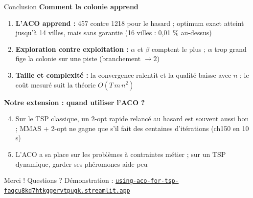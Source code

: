 \documentclass[aspectratio=169,11pt]{beamer}
\begin{document}
\begin{frame}{Conclusion}
  \footnotesize
  \textbf{Comment la colonie apprend}
  \begin{enumerate}
    \item \textbf{L'ACO apprend :} 457 contre 1218 pour le hasard ; optimum exact atteint jusqu'à
          14 villes, mais sans garantie (16 villes : 0,01 \% au-dessus)
    \item \textbf{Exploration contre exploitation :} $\alpha$ et $\beta$ comptent le plus ;
          $\alpha$ trop grand fige la colonie sur une piste (branchement $\to 2$)
    \item \textbf{Taille et complexité :} la convergence ralentit et la qualité baisse avec $n$ ;
          le coût mesuré suit la théorie $O(T\,m\,n^2)$
  \end{enumerate}
  \textbf{Notre extension : quand utiliser l'ACO ?}
  \begin{enumerate}\setcounter{enumi}{3}
    \item Sur le TSP classique, un 2-opt rapide relancé au hasard est souvent aussi bon ;
          \alert{MMAS + 2-opt} ne gagne que s'il fait des centaines d'itérations (ch150 en 10 s)
    \item L'ACO a sa place sur les problèmes à contraintes métier ; sur un TSP dynamique, garder
          ses phéromones aide peu
  \end{enumerate}
  \centering
  \alert{Merci ! Questions ?} \quad
  \scriptsize Démonstration :
  \href{https://using-aco-for-tsp-faqcu8kd7htkggervtpugk.streamlit.app}{\nolinkurl{using-aco-for-tsp-faqcu8kd7htkggervtpugk.streamlit.app}}
\end{frame}


\appendix
\end{document}

